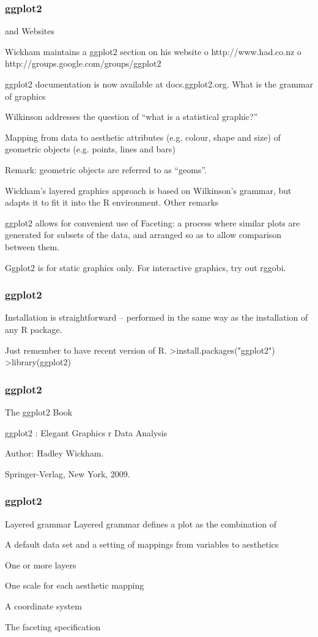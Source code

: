 \begin{frame}[fragile]
\frametitle{ggplot2}
\largeDocumentation and Websites
\item Wickham maintains a ggplot2 section on his website
o http://www.had.co.nz
o http://groups.google.com/groups/ggplot2
\item ggplot2 documentation is now available at docs.ggplot2.org.
What is the grammar of graphics
\item Wilkinson addresses the question of “what is a statistical graphic?”
\item Mapping from data to aesthetic attributes (e.g. colour, shape and size) of geometric objects (e.g. points, lines and bars)
\item Remark: geometric objects are referred to as “geoms”.
\item Wickham’s layered graphics approach is based on Wilkinson’s grammar, but adapts it to fit it into the R environment.
Other remarks
\item ggplot2 allows for convenient use of Faceting: a process where similar plots are generated for subsets of the data, and arranged so as to allow comparison between them.
\item Ggplot2 is for static graphics only. For interactive graphics, try out rggobi.
\end{frame}
\begin{frame}[fragile]
\frametitle{ggplot2}
\largePreliminaries
\item Installation is straightforward – performed in the same way as the installation of any R package.
\item Just remember to have recent version of R. >install.packages("ggplot2") >library(ggplot2)
\end{frame}
\begin{frame}[fragile]
\frametitle{ggplot2}
\large The ggplot2 Book
\item ggplot2 : Elegant Graphics r Data Analysis
\item Author: Hadley Wickham.
\item Springer-Verlag, New York, 2009.
\end{frame}
\begin{frame}[fragile]
\frametitle{ggplot2}
\large
Layered grammar
Layered grammar defines a plot as the combination of
\item A default data set and a setting of mappings from variables to aesthetics
\item One or more layers
\item One scale for each aesthetic mapping
\item A coordinate system
\item The faceting specification
\end{frame}
